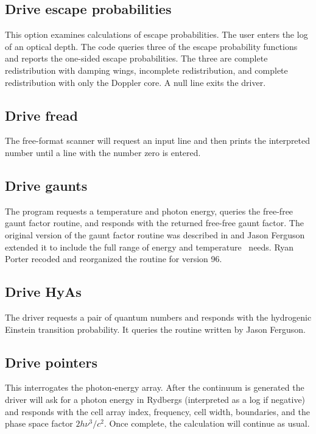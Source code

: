 \subsection{Drive escape probabilities}

This option examines calculations of escape probabilities.
The user
enters the log of an optical depth.
The code queries three of the escape
probability functions and reports the one-sided escape probabilities.
The
three are complete redistribution with damping wings, incomplete
redistribution, and complete redistribution with only the Doppler core.
A null line exits the driver.

\subsection{Drive fread  }

The free-format scanner will request an input line and then prints the
interpreted number until a line with the number zero is entered.

\subsection{Drive gaunts  }

The program requests a temperature and photon energy, queries the
free-free gaunt factor routine, and responds with the returned free-free
gaunt factor.
The original version of the gaunt factor routine was described
in \citet{Hummer1988} and Jason Ferguson extended it to include the full range
of energy and temperature \Cloudy\ needs.
Ryan Porter recoded and reorganized the routine for version 96.

\subsection{Drive HyAs}

The driver requests a pair of quantum numbers and responds with the
hydrogenic Einstein transition probability.
It queries the routine 
written by Jason Ferguson.

\subsection{Drive pointers  }

This interrogates the photon-energy array.
After the continuum is
generated the driver will ask for a photon energy in Rydbergs
(interpreted as a log if negative) and responds with the cell array index, frequency, cell width, boundaries, and the phase space factor
$2h\nu ^3 /c^2$.
Once complete, the calculation will continue as usual.

